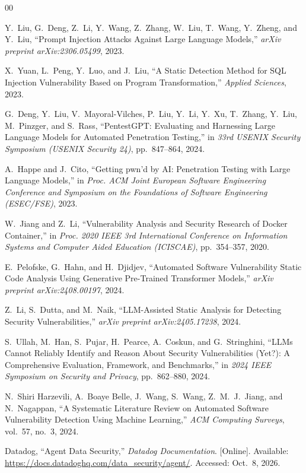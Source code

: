 \documentclass[journal]{IEEEtran}
\begin{document}
\begin{thebibliography}{00}

Y.~Liu, G.~Deng, Z.~Li, Y.~Wang, Z.~Zhang, W.~Liu, T.~Wang,
Y.~Zheng, and Y.~Liu,
``Prompt Injection Attacks Against Large Language Models,''
\textit{arXiv preprint arXiv:2306.05499}, 2023.

X.~Yuan, L.~Peng, Y.~Luo, and J.~Liu,
``A Static Detection Method for SQL Injection Vulnerability Based on Program Transformation,''
\textit{Applied Sciences}, 2023.

G.~Deng, Y.~Liu, V.~Mayoral-Vilches, P.~Liu, Y.~Li, Y.~Xu,
T.~Zhang, Y.~Liu, M.~Pinzger, and S.~Rass,
``PentestGPT: Evaluating and Harnessing Large Language Models for Automated Penetration Testing,''
in \textit{33rd USENIX Security Symposium (USENIX Security 24)},
pp.~847--864, 2024.

A.~Happe and J.~Cito,
``Getting pwn'd by AI: Penetration Testing with Large Language Models,''
in \textit{Proc. ACM Joint European Software Engineering Conference and Symposium on the Foundations of Software Engineering (ESEC/FSE)},
2023.

W.~Jiang and Z.~Li,
``Vulnerability Analysis and Security Research of Docker Container,''
in \textit{Proc. 2020 IEEE 3rd International Conference on Information Systems and Computer Aided Education (ICISCAE)},
pp.~354--357, 2020.

E.~Pelofske, G.~Hahn, and H.~Djidjev,
``Automated Software Vulnerability Static Code Analysis Using Generative Pre-Trained Transformer Models,''
\textit{arXiv preprint arXiv:2408.00197}, 2024.

Z.~Li, S.~Dutta, and M.~Naik,
``LLM-Assisted Static Analysis for Detecting Security Vulnerabilities,''
\textit{arXiv preprint arXiv:2405.17238}, 2024.

S.~Ullah, M.~Han, S.~Pujar, H.~Pearce, A.~Coskun,
and G.~Stringhini,
``LLMs Cannot Reliably Identify and Reason About Security Vulnerabilities (Yet?): A Comprehensive Evaluation, Framework, and Benchmarks,''
in \textit{2024 IEEE Symposium on Security and Privacy},
pp.~862--880, 2024.

N.~Shiri Harzevili, A.~Boaye Belle, J.~Wang, S.~Wang,
Z.~M.~J.~Jiang, and N.~Nagappan,
``A Systematic Literature Review on Automated Software Vulnerability Detection Using Machine Learning,''
\textit{ACM Computing Surveys}, vol.~57, no.~3, 2024.

Datadog,
``Agent Data Security,''
\textit{Datadog Documentation}.
[Online]. Available:
\url{https://docs.datadoghq.com/data_security/agent/}.
Accessed: Oct.~8, 2026.


\end{thebibliography}
\end{document}
